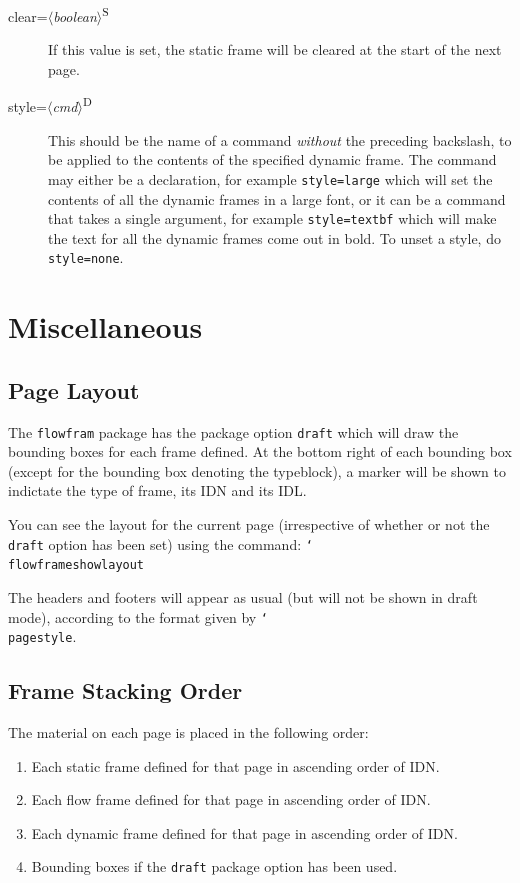 \documentclass[a4paper,twoside]{report}
\newcommand{\cmdname}[1]{\texttt{\char`\\#1}}
\newcommand{\sty}[1]{\texttt{#1}}
\newcommand{\meta}[1]{$\langle$\emph{#1}$\rangle$}
\begin{document}
\begin{description}
\item[clear=\meta{boolean}\textsuperscript{S}] If this value
is set, the static frame will be cleared at the start of the
next page.

\item[style=\meta{cmd}\textsuperscript{D}] This should be
the name of a command \emph{without} the preceding backslash, 
to be applied to the contents of the specified dynamic frame. 
The command may either be a declaration, for example \verb/style=large/
which will set the contents of all the dynamic frames in a
large font, or it can be a command that takes a single argument,
for example \verb/style=textbf/
which will make the text for all the dynamic frames come out in 
bold.  To unset a style, do \verb/style=none/.

\end{description}

\chapter{Miscellaneous}

\section{Page Layout}

The \sty{flowfram} package has the package option \texttt{draft}
which will draw the {bounding boxes} for
each frame defined.  At the bottom right of each
bounding box (except for the bounding box denoting the 
typeblock), a marker will be shown to indictate the type
of frame, its IDN and its IDL.

You can see the layout for the current page (irrespective of
whether or not the \texttt{draft} option has been set) using
the command:\newline 
\cmdname{flowframeshowlayout}

The headers and footers will appear as usual (but will not
be shown in draft mode), according to the format given by 
\cmdname{pagestyle}.

\section{Frame Stacking Order}

The material on each page is placed in the following order:
\begin{enumerate}
\item Each static frame defined for that page in ascending
order of IDN.

\item Each flow frame defined for that page in ascending
order of IDN.

\item Each dynamic frame defined for that page in ascending
order of IDN.

\item {Bounding boxes} if the \texttt{draft}
package option has been used.
\end{enumerate}
\end{document}
